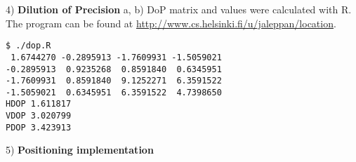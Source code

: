 \documentclass[a4paper,parskip=full]{scrartcl}
\begin{document}
4) \textbf{Dilution of Precision}
a, b) DoP matrix and values were calculated with R. The program can be found at
\url{http://www.cs.helsinki.fi/u/jaleppan/location}.
\begin{verbatim}
$ ./dop.R
 1.6744270 -0.2895913 -1.7609931 -1.5059021
-0.2895913  0.9235268  0.8591840  0.6345951
-1.7609931  0.8591840  9.1252271  6.3591522
-1.5059021  0.6345951  6.3591522  4.7398650
HDOP 1.611817
VDOP 3.020799
PDOP 3.423913
\end{verbatim}

5) \textbf{Positioning implementation}

%
%
\end{document}
